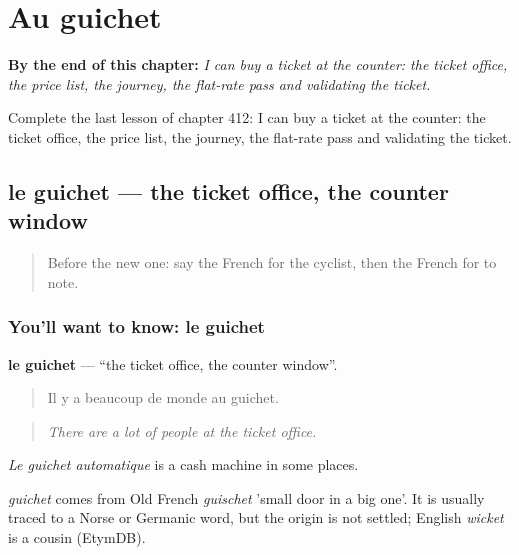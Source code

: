 
\chapter{Au guichet}
\label{ch:fr-au-guichet}

\begin{chapteropening}
\textbf{By the end of this chapter:} \emph{I can buy a ticket at the counter: the ticket office, the price list, the journey, the flat-rate pass and validating the ticket.}

Complete the last lesson of chapter 412: I can buy a ticket at the counter: the ticket office, the price list, the journey, the flat-rate pass and validating the ticket.
\end{chapteropening}

\section[le guichet]{le guichet — the ticket office, the counter window}

\label{lesson:FR-C412-guichet}



\begin{quote}
Before the new one: say the French for the cyclist, then the French for to note.
\end{quote}

\subsection*{You'll want to know: le guichet}
\textbf{le guichet} — \textquotedblleft{}the ticket office, the counter window\textquotedblright{}.

\begin{quote}
Il y a beaucoup de monde au guichet.
\end{quote}

\begin{quote}
\emph{There are a lot of people at the ticket office.}
\end{quote}

\emph{Le guichet automatique} is a cash machine in some places.

\begin{cousinweb}
\emph{guichet} comes from Old French \emph{guischet} 'small door in a big one'. It is usually traced to a Norse or Germanic word, but the origin is not settled; English \emph{wicket} is a cousin (EtymDB).
\end{cousinweb}


